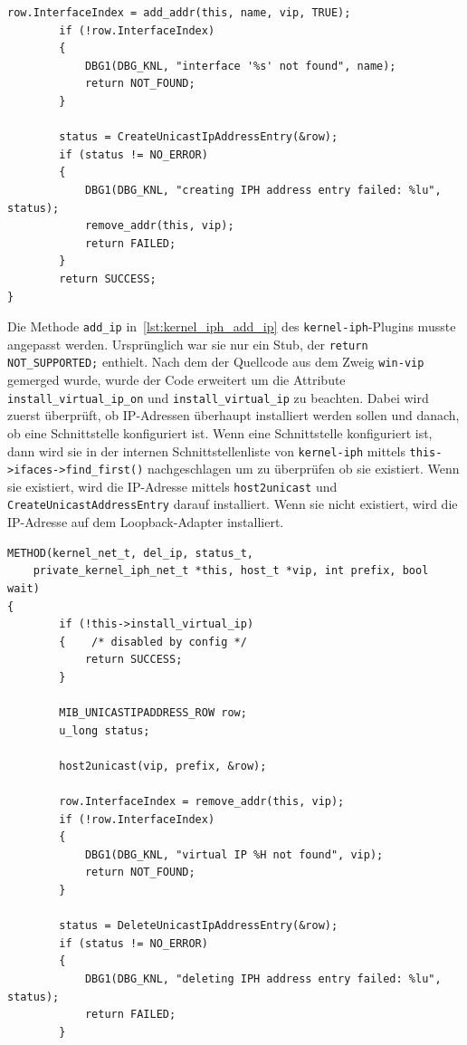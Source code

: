 {\begin{lstlisting}[caption=Code für add\_ip,label=lst:kernel_iph_add_ip]
        row.InterfaceIndex = add_addr(this, name, vip, TRUE);
        if (!row.InterfaceIndex)
        {
            DBG1(DBG_KNL, "interface '%s' not found", name);
            return NOT_FOUND;
        }

        status = CreateUnicastIpAddressEntry(&row);
        if (status != NO_ERROR)
        {
            DBG1(DBG_KNL, "creating IPH address entry failed: %lu", status);
            remove_addr(this, vip);
            return FAILED;
        }
        return SUCCESS;
}
\end{lstlisting}

Die Methode \texttt{add\_ip} in~\autoref{lst:kernel_iph_add_ip} des \texttt{kernel-iph}-Plugins musste angepasst werden.
Ursprünglich war sie nur ein Stub, der \texttt{return NOT\_SUPPORTED;} enthielt.
Nach dem der Quellcode aus dem Zweig \texttt{win-vip} gemerged wurde, wurde der Code erweitert
um die Attribute \texttt{install\_virtual\_ip\_on} und \texttt{install\_virtual\_ip} zu beachten.
Dabei wird zuerst überprüft, ob \ac{IP}-Adressen überhaupt installiert werden
sollen und danach, ob eine Schnittstelle konfiguriert ist.
Wenn eine Schnittstelle konfiguriert ist, dann wird sie in der internen
Schnittstellenliste von \texttt{kernel-iph} mittels \texttt{this->ifaces->find\_first()}
nachgeschlagen um zu überprüfen ob sie existiert. Wenn sie existiert,
wird die \ac{IP}-Adresse mittels \texttt{host2unicast} und
\texttt{CreateUnicastAddressEntry} darauf installiert. Wenn sie nicht existiert, 
wird die \ac{IP}-Adresse auf dem Loopback-Adapter installiert.

\begin{lstlisting}[caption=Code für del\_ip,label=lst:kernel_iph_del_ip]
METHOD(kernel_net_t, del_ip, status_t,
    private_kernel_iph_net_t *this, host_t *vip, int prefix, bool wait)
{
        if (!this->install_virtual_ip)
        {    /* disabled by config */
            return SUCCESS;
        }

        MIB_UNICASTIPADDRESS_ROW row;
        u_long status;

        host2unicast(vip, prefix, &row);

        row.InterfaceIndex = remove_addr(this, vip);
        if (!row.InterfaceIndex)
        {
            DBG1(DBG_KNL, "virtual IP %H not found", vip);
            return NOT_FOUND;
        }

        status = DeleteUnicastIpAddressEntry(&row);
        if (status != NO_ERROR)
        {
            DBG1(DBG_KNL, "deleting IPH address entry failed: %lu", status);
            return FAILED;
        }


\end{lstlisting}}
